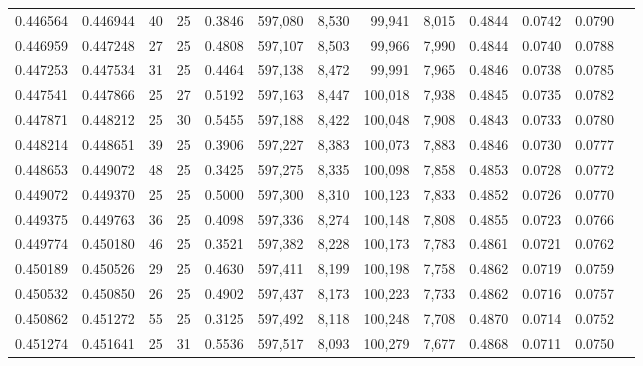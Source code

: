 \begin{tabular}{rrrrrrrrrrrrr}
0.446564 & 0.446944 &    40 &  25 &                                     0.3846 & 597,080 &   8,530 &  99,941 &   8,015 & 0.4844 & 0.0742 & 0.0790 \\
0.446959 & 0.447248 &    27 &  25 &                                     0.4808 & 597,107 &   8,503 &  99,966 &   7,990 & 0.4844 & 0.0740 & 0.0788 \\
0.447253 & 0.447534 &    31 &  25 &                                     0.4464 & 597,138 &   8,472 &  99,991 &   7,965 & 0.4846 & 0.0738 & 0.0785 \\
0.447541 & 0.447866 &    25 &  27 &                                     0.5192 & 597,163 &   8,447 & 100,018 &   7,938 & 0.4845 & 0.0735 & 0.0782 \\
0.447871 & 0.448212 &    25 &  30 &                                     0.5455 & 597,188 &   8,422 & 100,048 &   7,908 & 0.4843 & 0.0733 & 0.0780 \\
0.448214 & 0.448651 &    39 &  25 &                                     0.3906 & 597,227 &   8,383 & 100,073 &   7,883 & 0.4846 & 0.0730 & 0.0777 \\
0.448653 & 0.449072 &    48 &  25 &                                     0.3425 & 597,275 &   8,335 & 100,098 &   7,858 & 0.4853 & 0.0728 & 0.0772 \\
0.449072 & 0.449370 &    25 &  25 &                                     0.5000 & 597,300 &   8,310 & 100,123 &   7,833 & 0.4852 & 0.0726 & 0.0770 \\
0.449375 & 0.449763 &    36 &  25 &                                     0.4098 & 597,336 &   8,274 & 100,148 &   7,808 & 0.4855 & 0.0723 & 0.0766 \\
0.449774 & 0.450180 &    46 &  25 &                                     0.3521 & 597,382 &   8,228 & 100,173 &   7,783 & 0.4861 & 0.0721 & 0.0762 \\
0.450189 & 0.450526 &    29 &  25 &                                     0.4630 & 597,411 &   8,199 & 100,198 &   7,758 & 0.4862 & 0.0719 & 0.0759 \\
0.450532 & 0.450850 &    26 &  25 &                                     0.4902 & 597,437 &   8,173 & 100,223 &   7,733 & 0.4862 & 0.0716 & 0.0757 \\
0.450862 & 0.451272 &    55 &  25 &                                     0.3125 & 597,492 &   8,118 & 100,248 &   7,708 & 0.4870 & 0.0714 & 0.0752 \\
0.451274 & 0.451641 &    25 &  31 &                                     0.5536 & 597,517 &   8,093 & 100,279 &   7,677 & 0.4868 & 0.0711 & 0.0750 \\

\end{tabular}
